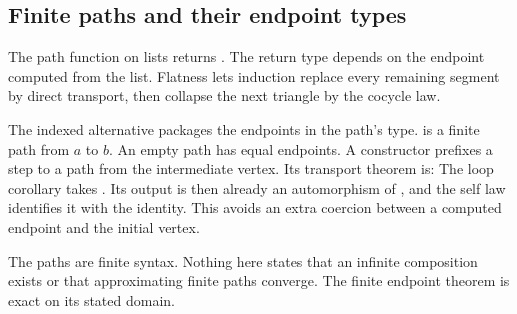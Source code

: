 \subsection{Finite paths and their endpoint types}
The path function on lists returns
.
The return type depends on the endpoint computed from the list. Flatness lets induction replace every remaining segment by direct transport, then collapse the next triangle by the cocycle law.

The indexed alternative packages the endpoints in the path's type.  is a finite path from $a$ to $b$. An empty path has equal endpoints. A constructor prefixes a step to a path from the intermediate vertex. Its transport theorem is:
The loop corollary takes . Its output is then already an automorphism of , and the self law identifies it with the identity. This avoids an extra coercion between a computed endpoint and the initial vertex.

The paths are finite syntax. Nothing here states that an infinite composition exists or that approximating finite paths converge. The finite endpoint theorem is exact on its stated domain.

